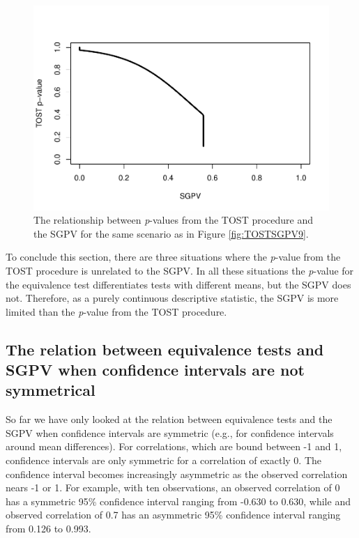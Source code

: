 \documentclass[floatsintext,man]{apa6}
\theoremstyle{definition}
\theoremstyle{definition}
\theoremstyle{definition}
\theoremstyle{remark}
\begin{document}
\begin{figure}
\centering
\includegraphics{manuscript_files/figure-latex/TOSTSGPV10-1.pdf}
\caption{\label{fig:TOSTSGPV10}The relationship between \emph{p}-values from
the TOST procedure and the SGPV for the same scenario as in Figure
\ref{fig:TOSTSGPV9}.}
\end{figure}

To conclude this section, there are three situations where the
\emph{p}-value from the TOST procedure is unrelated to the SGPV. In all
these situations the \emph{p}-value for the equivalence test
differentiates tests with different means, but the SGPV does not.
Therefore, as a purely continuous descriptive statistic, the SGPV is
more limited than the \emph{p}-value from the TOST procedure.

\subsection{The relation between equivalence tests and SGPV when
confidence intervals are not
symmetrical}\label{the-relation-between-equivalence-tests-and-sgpv-when-confidence-intervals-are-not-symmetrical}

So far we have only looked at the relation between equivalence tests and
the SGPV when confidence intervals are symmetric (e.g., for confidence
intervals around mean differences). For correlations, which are bound
between -1 and 1, confidence intervals are only symmetric for a
correlation of exactly 0. The confidence interval becomes increasingly
asymmetric as the observed correlation nears -1 or 1. For example, with
ten observations, an observed correlation of 0 has a symmetric 95\%
confidence interval ranging from -0.630 to 0.630, while and observed
correlation of 0.7 has an asymmetric 95\% confidence interval ranging
from 0.126 to 0.993.
\end{document}
